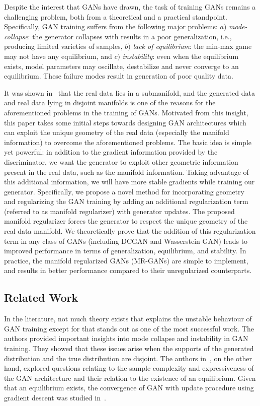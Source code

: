 \documentclass[10pt,twocolumn,letterpaper]{article}
\begin{document}
Despite the interest that GANs have drawn, the task of training GANs remains a challenging problem, both from a theoretical and a practical standpoint. 
{{Specifically, GAN training suffers from the following major problems: $a)$ \textit{mode-collapse}: the generator collapses with results in a poor generalization, i.e., producing limited varieties of samples, $b)$ \textit{lack of equilibrium}: the min-max game may not have any  equilibrium, and $c)$ \textit{instability}: even when the equilibrium exists, model parameters may oscillate, destabilize and never converge to an equilibrium.}} These failure modes result in generation of poor quality data. 

It was shown in~\cite{arjovsky2017towards} that the real data lies in a submanifold, and the generated data and real data lying in disjoint manifolds is one of the reasons for the aforementioned problems in the training of GANs. Motivated from this insight, this paper takes some initial steps towards designing GAN architectures which can exploit the unique geometry of the real data (especially the manifold information) to overcome the aforementioned problems. 
The basic idea
is simple yet powerful: in addition to the gradient
information provided by the discriminator, we want
the generator to exploit other geometric information present in the real data, such
as the manifold information. Taking advantage of this additional information, we will have more stable gradients while
training our generator. 
Specifically, we propose a novel method for incorporating geometry and regularizing the GAN training by adding an additional regularization term (referred to as manifold regularizer) with generator updates. The proposed manifold regularizer forces the generator to respect the unique geometry of the real data manifold. We theoretically prove that the addition of this regularization term in any class of GANs (including DCGAN and Wasserstein GAN) leads to improved performance in terms of generalization, equilibrium, and stability.
In practice, the manifold regularized GANs (MR-GANs) are simple to implement, and results in better performance compared to their unregularized counterparts.

\subsection{Related Work}
In the literature, not much theory exists that explains the unstable behaviour of GAN training except for \cite{arjovsky2017towards} that stands out as one of the most successful work. The authors provided important insights into mode collapse and instability in GAN training. They showed that these issues arise when the supports of the generated distribution and the true distribution are disjoint. The authors in~\cite{arora2017generalization}, on the other hand, explored questions relating to the sample complexity and expressiveness of the GAN architecture and their relation to the existence of an equilibrium. Given that an equilibrium exists, the convergence of GAN with update procedure using gradient descent was studied in~\cite{nagarajan2017gradient}.
\end{document}
